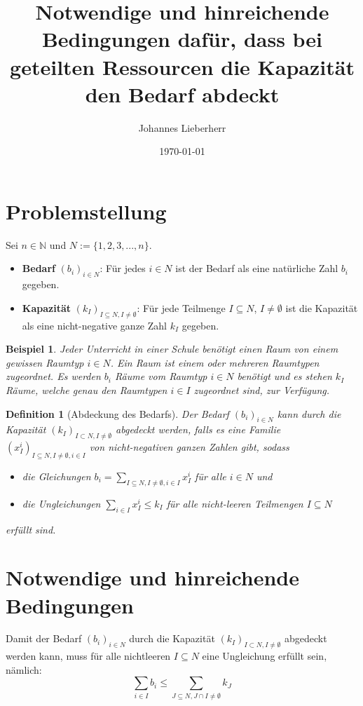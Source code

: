 \documentclass{article}
\title{Notwendige und hinreichende Bedingungen dafür, dass bei geteilten Ressourcen die Kapazität den Bedarf  abdeckt}
\author{Johannes Lieberherr}
\date{\today}
\newtheorem{definition}{Definition}
\newtheorem{example}{Beispiel}
\begin{document}
	\maketitle
	\section{Problemstellung}
	Sei $n\in \mathbb{N}$ und $N := \{1, 2, 3, ..., n\}$.
	\begin{itemize}
		\item \textbf{Bedarf} $(b_i)_{i\in N}$: Für jedes $i \in N$ ist der Bedarf als eine natürliche Zahl $b_i$ gegeben.
		\item \textbf{Kapazität} $(k_I)_{I\subseteq N, I\neq \emptyset}$: Für jede Teilmenge $I\subseteq N$, $I\neq \emptyset$ ist die Kapazität als eine nicht-negative ganze Zahl $k_I$ gegeben.
	\end{itemize}
	
	\begin{example}
		Jeder Unterricht in einer Schule benötigt einen Raum von einem gewissen Raumtyp $i\in N$. Ein Raum ist einem oder mehreren Raumtypen zugeordnet. Es werden $b_i$ Räume vom Raumtyp $i\in N$ benötigt und es stehen $k_I$ Räume, welche genau den Raumtypen $i\in I$ zugeordnet sind, zur Verfügung.
	\end{example}
	 
	
	\begin{definition}[Abdeckung des Bedarfs]
		Der Bedarf $(b_i)_{i\in N}$ kann durch die Kapazität $(k_I)_{I\subset N, I\neq \emptyset}$ abgedeckt werden, falls es eine Familie $(x_I^i)_{I\subseteq  N, I\neq \emptyset, i\in I}$ von nicht-negativen ganzen Zahlen  gibt, sodass
		\begin{itemize}
			\item die Gleichungen $b_i = \sum_{I\subseteq N, I\neq \emptyset, i\in I}x_I^i$ für alle $i\in N$ und
			\item die Ungleichungen $\sum_{i\in I} x_I^i \leq k_I$ für alle nicht-leeren Teilmengen $I\subseteq N$
		\end{itemize}
		erfüllt sind.
	\end{definition}
	
	
	\section{Notwendige und hinreichende Bedingungen}
		
	Damit der Bedarf $(b_i)_{i\in N}$ durch die Kapazität $(k_I)_{I\subset N, I\neq \emptyset}$ abgedeckt werden kann, muss für alle nichtleeren $I\subseteq N$ eine Ungleichung erfüllt sein, nämlich:
	\begin{equation}
			\sum_{i \in I}b_i \leq \sum_{J\subseteq N, J\cap I \neq \emptyset}k_J
			\label{eq:condition}
	\end{equation}
\end{document}

